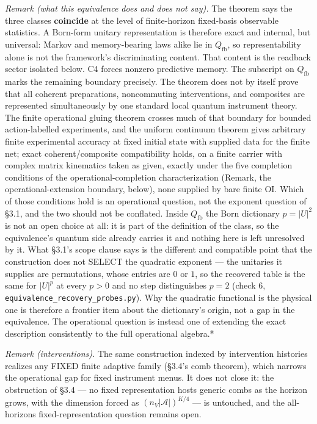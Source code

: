 \documentclass[
]{article}
\begin{document}
\emph{Remark (what this equivalence does and does not say).} The theorem
says the three classes \textbf{coincide} at the level of finite-horizon
fixed-basis observable statistics. A Born-form unitary representation is
therefore exact and internal, but universal: Markov and memory-bearing
laws alike lie in \(Q_{\mathrm{fb}}\), so representability alone is not
the framework's discriminating content. That content is the readback
sector isolated below. C4 forces nonzero predictive memory. The
subscript on \(Q_{\mathrm{fb}}\) marks the remaining boundary precisely.
The theorem does not by itself prove that all coherent preparations,
noncommuting interventions, and composites are represented
simultaneously by one standard local quantum instrument theory. The
finite operational gluing theorem crosses much of that boundary for
bounded action-labelled experiments, and the uniform continuum theorem
gives arbitrary finite experimental accuracy at fixed initial state with
supplied data for the finite net; exact coherent/composite compatibility
holds, on a finite carrier with complex matrix kinematics taken as
given, exactly under the five completion conditions of the
operational-completion characterization (Remark, the
operational-extension boundary, below), none supplied by bare finite OI.
Which of those conditions hold is an operational question, not the
exponent question of §3.1, and the two should not be conflated. Inside
\(Q_{\mathrm{fb}}\) the Born dictionary \(p=|U|^2\) is not an open
choice at all: it is part of the definition of the class, so the
equivalence's quantum side already carries it and nothing here is left
unresolved by it. What §3.1's scope clause says is the different and
compatible point that the construction does not SELECT the quadratic
exponent --- the unitaries it supplies are permutations, whose entries
are \(0\) or \(1\), so the recovered table is the same for \(|U|^p\) at
every \(p>0\) and no step distinguishes \(p=2\) (check 6,
\texttt{equivalence\_recovery\_probes.py}). Why the quadratic functional
is the physical one is therefore a frontier item about the dictionary's
origin, not a gap in the equivalence. The operational question is
instead one of extending the exact description consistently to the full
operational algebra.*

\emph{Remark (interventions).} The same construction indexed by
intervention histories realizes any FIXED finite adaptive family (§3.4's
comb theorem), which narrows the operational gap for fixed instrument
menus. It does not close it: the obstruction of §3.4 --- no fixed
representation hosts generic combs as the horizon grows, with the
dimension forced as \((n_V|\mathcal{A}|)^{K/4}\) --- is untouched, and
the all-horizons fixed-representation question remains open.
\end{document}
